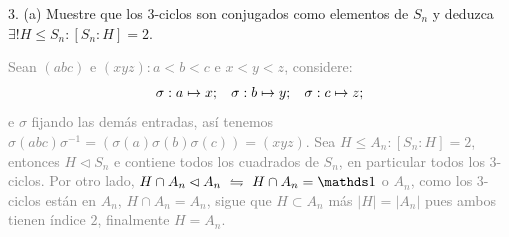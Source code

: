 3. (a) Muestre que los \(3\)-ciclos son conjugados como elementos de \(S_n\) y deduzca \(\exists ! H \leq S_n : [S_n : H] = 2\).  

\textcolor{gray}{
  Sean \((abc)\) e \((xyz) : a < b < c\) e \(x < y < z\), considere: 
  \[\sigma : a \mapsto x; \hspace{0.3cm} \sigma : b \mapsto y; \hspace{0.3cm}   
    \sigma : c \mapsto z;  
  \] 
  e \(\sigma\) fijando las demás entradas, así tenemos \(\sigma (abc) \sigma^{-1} = (\sigma(a) \sigma(b) \sigma(c)) = (xyz)\). Sea \(H \leq A_n : [S_n : H] = 2\), entonces \(H\lhd S_n\) e contiene todos los cuadrados de \(S_n\), en particular todos los \(3\)-ciclos. Por otro lado, \(H \cap A_n \lhd A_n \ \leftrightharpoons \ H \cap A_n = \id \) o \(A_n\), como los \(3\)-ciclos están en \(A_n\), \(H\cap A_n = A_n\), sigue que \(H \subset A_n\) más \(|H| = |A_n|\) pues ambos tienen índice \(2\), finalmente \(H = A_n\).    
}

